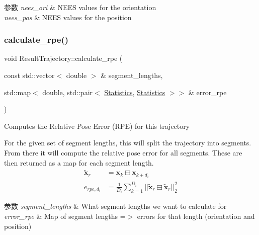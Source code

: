 \begin{DoxyParams}{参数}
{\em nees\+\_\+ori} & N\+E\+ES values for the orientation \\
\hline
{\em nees\+\_\+pos} & N\+E\+ES values for the position \\
\hline
\end{DoxyParams}
\mbox{\label{classov__eval_1_1ResultTrajectory_abf4d8b00abdf68692ceaa85b5c1c5b0f}} 
\subsubsection{\texorpdfstring{calculate\+\_\+rpe()}{calculate\_rpe()}}
{\footnotesize\ttfamily void Result\+Trajectory\+::calculate\+\_\+rpe (\begin{DoxyParamCaption}\item[{const std\+::vector$<$ double $>$ \&}]{segment\+\_\+lengths,  }\item[{std\+::map$<$ double, std\+::pair$<$ \hyperlink{structov__eval_1_1Statistics}{Statistics}, \hyperlink{structov__eval_1_1Statistics}{Statistics} $>$$>$ \&}]{error\+\_\+rpe }\end{DoxyParamCaption})}



Computes the Relative Pose Error (R\+PE) for this trajectory 

For the given set of segment lengths, this will split the trajectory into segments. From there it will compute the relative pose error for all segments. These are then returned as a map for each segment length. \begin{align*} \tilde{\mathbf{x}}_{r} &= \mathbf{x}_{k} \boxminus \mathbf{x}_{k+d_i} \\ e_{rpe,d_i} &= \frac{1}{D_i} \sum_{k=1}^{D_i} ||\tilde{\mathbf{x}}_{r} \boxminus \hat{\tilde{\mathbf{x}}}_{r}||^2_{2} \end{align*}


\begin{DoxyParams}{参数}
{\em segment\+\_\+lengths} & What segment lengths we want to calculate for \\
\hline
{\em error\+\_\+rpe} & Map of segment lengths =$>$ errors for that length (orientation and position) \\
\hline
\end{DoxyParams}
\mbox{\label{classov__eval_1_1ResultTrajectory_af47fbcba5026b01aeb00df5c835ba296}} 
